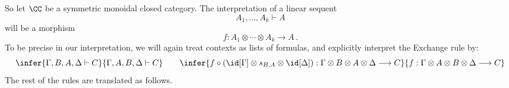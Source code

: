 \documentclass[12pt]{article}
\begin{document}
So let $\CC $ be a symmetric monoidal closed category. The interpretation of a linear sequent
\[ A_1 , \ldots , A_k \vdash A \]
will be a morphism
\[ f : A_1 \otimes \cdots \otimes A_k \longrightarrow A\,. \]
%
To be precise in our interpretation, we will again treat contexts as {lists} of formulas, and explicitly interpret the Exchange rule by:
\[ \infer{\Gamma , B, A, \Delta \vdash C}{\Gamma , A, B, \Delta  \vdash C}
\qquad \infer{f \circ (\id[\Gamma] \otimes s_{B, A} \otimes \id[\Delta])   : \Gamma
  \otimes B \otimes A \otimes \Delta \longrightarrow C}{f : \Gamma \otimes  A \otimes B \otimes \Delta \longrightarrow C}\]
%
The rest of the rules are translated as follows.
\begin{center}\renewcommand{\arraystretch}{0.6}
 
\end{center}
\end{document}
